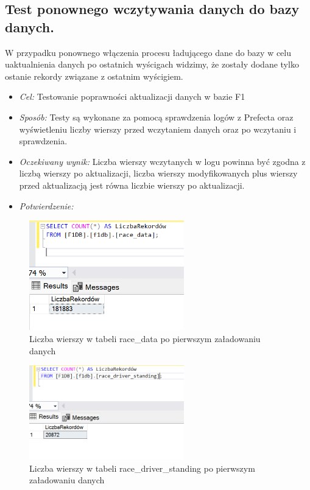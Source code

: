 \documentclass[12pt]{article}
\begin{document}
\subsection{Test ponownego wczytywania danych do bazy danych.}
W przypadku ponownego włączenia procesu ładującego dane do bazy w celu uaktualnienia danych po ostatnich wyścigach widzimy, że zostały dodane tylko ostanie rekordy związane z ostatnim wyścigiem.

\begin{itemize}
    \item \textit{Cel:} Testowanie poprawności aktualizacji danych w bazie F1
    \item \textit{Sposób:}
    Testy są wykonane za pomocą sprawdzenia logów z Prefecta oraz wyświetleniu liczby wierszy przed wczytaniem danych oraz po wczytaniu i sprawdzenia.
     \item \textit{Oczekiwany wynik:}
     Liczba wierszy wczytanych w logu powinna być zgodna z liczbą wierszy po aktualizacji, liczba wierszy modyfikowanych plus wierszy przed aktualizacją jest równa liczbie wierszy po aktualizacji.
      \item \textit{Potwierdzenie:}
\end{itemize}

\begin{figure}[H]
    \centering   \includegraphics[width=0.6\textwidth]{test2.png}
    \caption{Liczba wierszy w tabeli race\_data po pierwszym załadowaniu danych}
\end{figure}

\begin{figure}[H]
    \centering   \includegraphics[width=0.6\textwidth]{test3.png}
    \caption{Liczba wierszy w tabeli race\_driver\_standing po pierwszym załadowaniu danych}
\end{figure}
\end{document}
